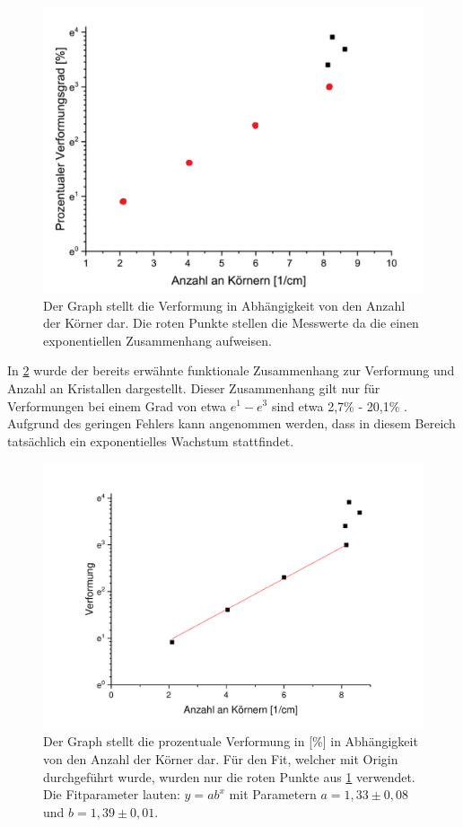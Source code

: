 \documentclass[
	a4paper,
	12pt,
	pagesize,
	ngerman
]{scrartcl}
\begin{document}
\begin{figure}[h!]
    \centering
    \includegraphics[scale = 0.3]{tempsnip.png}
    \caption{Der Graph stellt die Verformung in Abhängigkeit von den Anzahl der Körner dar. Die roten Punkte stellen die Messwerte da die einen exponentiellen Zusammenhang aufweisen.}
    \label{A2}
\end{figure}
In \cref{A3} wurde der bereits erwähnte funktionale Zusammenhang zur Verformung und Anzahl an Kristallen dargestellt. Dieser Zusammenhang gilt nur für Verformungen bei einem Grad von etwa $e^1 - e^3$ sind etwa 2,7\% - 20,1\% . Aufgrund des geringen Fehlers kann angenommen werden, dass in diesem Bereich tatsächlich ein exponentielles Wachstum stattfindet.
\begin{figure}[h!]
    \centering
    \includegraphics[scale = 0.6]{fitfit.pdf}
    \caption{Der Graph stellt die prozentuale Verformung in [\%] in Abhängigkeit von den Anzahl der Körner dar. Für den Fit, welcher mit Origin durchgeführt wurde, wurden nur die roten Punkte aus \cref{A2} verwendet. Die Fitparameter lauten:
    $y=ab^x$ mit Parametern $a=1,33\pm 0,08$ und $b = 1,39 \pm 0,01$.}
    \label{A3}
\end{figure}
\end{document}
